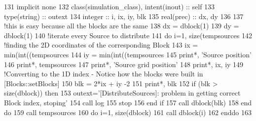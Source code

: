 \begin{DoxyCode}
131     \textcolor{keywordtype}{implicit none}
132     \textcolor{keywordtype}{class}(simulation\_class), \textcolor{keywordtype}{intent(inout)} :: self
133     \textcolor{keywordtype}{type}(string) :: outext
134     \textcolor{keywordtype}{integer} :: i, ix, iy, blk
135     \textcolor{keywordtype}{real(prec)} :: dx, dy
136     
137     \textcolor{comment}{!this is easy because all the blocks are the same}
138     dx = dblock(1)%
139     dy = dblock(1)%
140     \textcolor{comment}{!iterate every Source to distribute}
141     \textcolor{keywordflow}{do} i=1, \textcolor{keyword}{size}(tempsources%
142         \textcolor{comment}{!finding the 2D coordinates of the corresponding Block}
143         ix = min(int((tempsources%
144         iy = min(int((tempsources%
145         print*, \textcolor{stringliteral}{'Source position'}
146         print*, tempsources%
147         print*, \textcolor{stringliteral}{'Source grid position'}
148         print*, ix, iy
149         \textcolor{comment}{!Converting to the 1D index - Notice how the blocks were built in [Blocks::setBlocks]}
150         blk = 2*ix + iy -2
151         print*, blk
152         \textcolor{keywordflow}{if} (blk > \textcolor{keyword}{size}(dblock)) \textcolor{keywordflow}{then}
153             outext=\textcolor{stringliteral}{'[DistributeSources]: problem in getting correct Block index, stoping'}
154             \textcolor{keyword}{call }log%
155             stop
156 \textcolor{keywordflow}{        end if}
157         \textcolor{keyword}{call }dblock(blk)%
158 \textcolor{keywordflow}{    end do}
159     \textcolor{keyword}{call }tempsources%
160     \textcolor{keywordflow}{do} i=1, \textcolor{keyword}{size}(dblock)
161         \textcolor{keyword}{call }dblock(i)%
162 \textcolor{keywordflow}{    enddo}
163     
\end{DoxyCode}
\mbox{\label{namespacesimulation__mod_aedbba2bb458cbcd7eb93938a5f7b5940}} 
